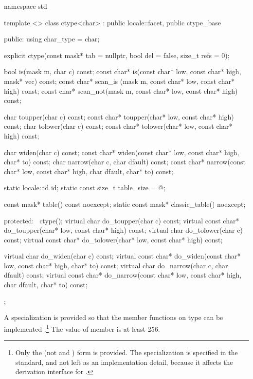 %
\begin{codeblock}
namespace std {
  template <> class ctype<char>
    : public locale::facet, public ctype_base {
  public:
    using char_type = char;

    explicit ctype(const mask* tab = nullptr, bool del = false,
                   size_t refs = 0);

    bool is(mask m, char c) const;
    const char* is(const char* low, const char* high, mask* vec) const;
    const char* scan_is (mask m,
                         const char* low, const char* high) const;
    const char* scan_not(mask m,
                         const char* low, const char* high) const;

    char        toupper(char c) const;
    const char* toupper(char* low, const char* high) const;
    char        tolower(char c) const;
    const char* tolower(char* low, const char* high) const;

    char  widen(char c) const;
    const char* widen(const char* low, const char* high, char* to) const;
    char  narrow(char c, char dfault) const;
    const char* narrow(const char* low, const char* high, char dfault,
                       char* to) const;

    static locale::id id;
    static const size_t table_size = @\impdef@;

    const mask* table() const noexcept;
    static const mask* classic_table() noexcept;

  protected:
   ~ctype();
    virtual char        do_toupper(char c) const;
    virtual const char* do_toupper(char* low, const char* high) const;
    virtual char        do_tolower(char c) const;
    virtual const char* do_tolower(char* low, const char* high) const;

    virtual char        do_widen(char c) const;
    virtual const char* do_widen(const char* low,
                                 const char* high,
                                 char* to) const;
    virtual char        do_narrow(char c, char dfault) const;
    virtual const char* do_narrow(const char* low,
                                  const char* high,
                                  char dfault, char* to) const;
  };
}
\end{codeblock}

\pnum
A specialization
is provided so that the member functions on type
can be implemented
.\footnote{Only the
(not
and
)
form is provided.
The specialization is specified in the standard, and not left as an
implementation detail, because it affects the derivation interface for
.}
The  value of member
is at least 256.

